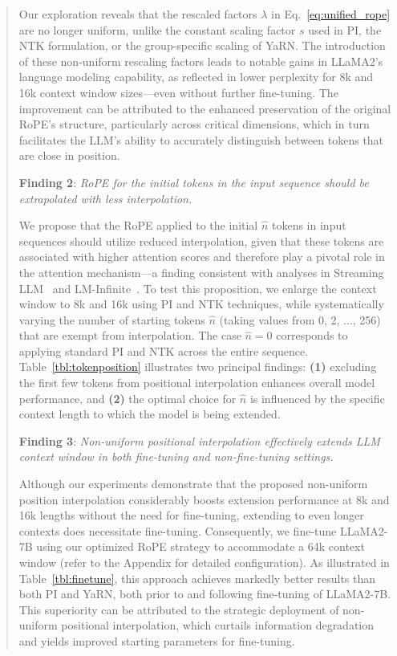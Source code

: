 \begin{abstract}
Our exploration reveals that the rescaled factors $\lambda$ in Eq.~\ref{eq:unified_rope} are no longer uniform, unlike the constant scaling factor $s$ used in PI, the NTK formulation, or the group-specific scaling of YaRN. The introduction of these non-uniform rescaling factors leads to notable gains in LLaMA2’s language modeling capability, as reflected in lower perplexity for 8k and 16k context window sizes—even without further fine-tuning. The improvement can be attributed to the enhanced preservation of the original RoPE’s structure, particularly across critical dimensions, which in turn facilitates the LLM’s ability to accurately distinguish between tokens that are close in position.

\textbf{Finding 2}: \textit{RoPE for the initial tokens in the input sequence should be extrapolated with less interpolation.} 

We propose that the RoPE applied to the initial $\hat{n}$ tokens in input sequences should utilize reduced interpolation, given that these tokens are associated with higher attention scores and therefore play a pivotal role in the attention mechanism—a finding consistent with analyses in Streaming LLM~\cite{streamingllm} and LM-Infinite~\cite{han2023lminfinite}. To test this proposition, we enlarge the context window to 8k and 16k using PI and NTK techniques, while systematically varying the number of starting tokens $\hat n$ (taking values from 0, 2, ..., 256) that are exempt from interpolation. The case $\hat n=0$ corresponds to applying standard PI and NTK across the entire sequence. Table~\ref{tbl:tokenposition} illustrates two principal findings: \textbf{(1)} excluding the first few tokens from positional interpolation enhances overall model performance, and \textbf{(2)} the optimal choice for $\hat n$ is influenced by the specific context length to which the model is being extended.

\textbf{Finding 3}: \textit{Non-uniform positional interpolation effectively extends LLM context window in both fine-tuning and non-fine-tuning settings.} 

Although our experiments demonstrate that the proposed non-uniform position interpolation considerably boosts extension performance at 8k and 16k lengths without the need for fine-tuning, extending to even longer contexts does necessitate fine-tuning. Consequently, we fine-tune LLaMA2-7B using our optimized RoPE strategy to accommodate a 64k context window (refer to the Appendix for detailed configuration). As illustrated in Table~\ref{tbl:finetune}, this approach achieves markedly better results than both PI and YaRN, both prior to and following fine-tuning of LLaMA2-7B. This superiority can be attributed to the strategic deployment of non-uniform positional interpolation, which curtails information degradation and yields improved starting parameters for fine-tuning.


\end{abstract}
